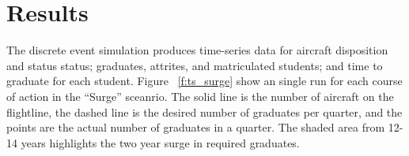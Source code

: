 \documentclass[preprint,12pt]{elsarticle}
\begin{document}
\section{Results}
\label{s:Results}




The discrete event simulation produces time-series data for aircraft
disposition and status status; graduates, attrites, and matriculated
students; and time to graduate for each
student. %
Figure ~\ref{f:ts_surge} show an single run for each course of action
in the ``Surge'' sceanrio. The solid line is the number of aircraft on the
flightline, the dashed line is the desired number of graduates per
quarter, and the points are the actual number of graduates in a
quarter. The shaded area from 12-14 years highlights the
two year surge in required graduates.


\end{document}
